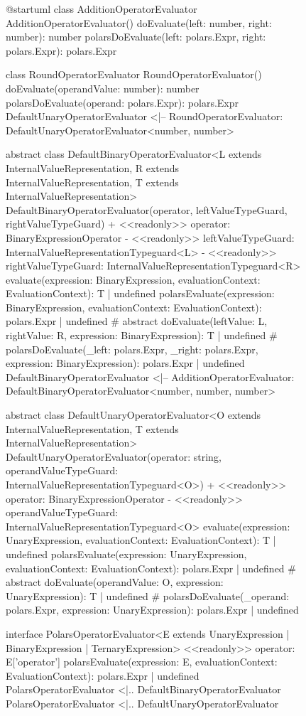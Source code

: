 \begin{figure}
	\begin{plantuml}
		@startuml
		class AdditionOperatorEvaluator {
				AdditionOperatorEvaluator()
				doEvaluate(left: number, right: number): number
				polarsDoEvaluate(left: polars.Expr, right: polars.Expr): polars.Expr
			}

		class RoundOperatorEvaluator {
				RoundOperatorEvaluator()
				doEvaluate(operandValue: number): number
				polarsDoEvaluate(operand: polars.Expr): polars.Expr
			}
		DefaultUnaryOperatorEvaluator <|-- RoundOperatorEvaluator: DefaultUnaryOperatorEvaluator<number, number>

		abstract class DefaultBinaryOperatorEvaluator<L extends InternalValueRepresentation, R extends InternalValueRepresentation, T extends InternalValueRepresentation> {
		DefaultBinaryOperatorEvaluator(operator, leftValueTypeGuard, rightValueTypeGuard)
		+ <<readonly>> operator: BinaryExpressionOperator
		- <<readonly>> leftValueTypeGuard: InternalValueRepresentationTypeguard<L>
		- <<readonly>> rightValueTypeGuard: InternalValueRepresentationTypeguard<R>
		evaluate(expression: BinaryExpression, evaluationContext: EvaluationContext): T | undefined
		polarsEvaluate(expression: BinaryExpression, evaluationContext: EvaluationContext): polars.Expr | undefined
		# {abstract} doEvaluate(leftValue: L, rightValue: R, expression: BinaryExpression): T | undefined
		# polarsDoEvaluate(_left: polars.Expr, _right: polars.Expr, expression: BinaryExpression): polars.Expr | undefined
		}
		DefaultBinaryOperatorEvaluator <|-- AdditionOperatorEvaluator: DefaultBinaryOperatorEvaluator<number, number, number>

		abstract class DefaultUnaryOperatorEvaluator<O extends InternalValueRepresentation, T extends InternalValueRepresentation> {
		DefaultUnaryOperatorEvaluator(operator: string, operandValueTypeGuard: InternalValueRepresentationTypeguard<O>)
		+ <<readonly>> operator: BinaryExpressionOperator
		- <<readonly>> operandValueTypeGuard: InternalValueRepresentationTypeguard<O>
		evaluate(expression: UnaryExpression, evaluationContext: EvaluationContext): T | undefined
		polarsEvaluate(expression: UnaryExpression, evaluationContext: EvaluationContext): polars.Expr | undefined
		# {abstract} doEvaluate(operandValue: O, expression: UnaryExpression): T | undefined
		# polarsDoEvaluate(_operand: polars.Expr, expression: UnaryExpression): polars.Expr | undefined
		}

		interface PolarsOperatorEvaluator<E extends UnaryExpression | BinaryExpression | TernaryExpression> {
				<<readonly>> operator: E['operator']
				polarsEvaluate(expression: E, evaluationContext: EvaluationContext): polars.Expr | undefined
			}
		PolarsOperatorEvaluator <|.. DefaultBinaryOperatorEvaluator
		PolarsOperatorEvaluator <|.. DefaultUnaryOperatorEvaluator


\end{plantuml}
\end{figure}

